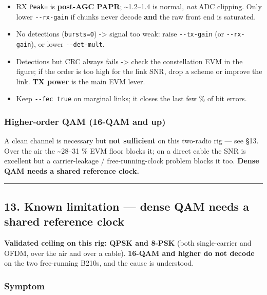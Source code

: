 \documentclass[
  10pt,
]{article}
\providecommand{\tightlist}{%
  \setlength{\itemsep}{0pt}\setlength{\parskip}{0pt}}
\begin{document}
\begin{itemize}
\tightlist
\item
  RX \texttt{Peak=} is \textbf{post-AGC PAPR}; \textasciitilde1.2--1.4
  is normal, \emph{not} ADC clipping. Only lower \texttt{-\/-rx-gain} if
  chunks never decode \textbf{and} the raw front end is saturated.
\item
  No detections (\texttt{bursts=0}) -\textgreater{} signal too weak:
  raise \texttt{-\/-tx-gain} (or \texttt{-\/-rx-gain}), or lower
  \texttt{-\/-det-mult}.
\item
  Detections but CRC always fails -\textgreater{} check the
  constellation EVM in the figure; if the order is too high for the link
  SNR, drop a scheme or improve the link. \textbf{TX power} is the main
  EVM lever.
\item
  Keep \texttt{-\/-fec\ true} on marginal links; it closes the last few
  \% of bit errors.
\end{itemize}

\hypertarget{higher-order-qam-16-qam-and-up}{%
\subsubsection{Higher-order QAM (16-QAM and
up)}\label{higher-order-qam-16-qam-and-up}}

A clean channel is necessary but \textbf{not sufficient} on this
two-radio rig --- see §13. Over the air the \textasciitilde28--31 \% EVM
floor blocks it; on a direct cable the SNR is excellent but a
carrier-leakage / free-running-clock problem blocks it too.
\textbf{Dense QAM needs a shared reference clock.}

\begin{center}\rule{0.5\linewidth}{0.5pt}\end{center}

\hypertarget{13-known-limitation--dense-qam-needs-a-shared-reference-clock}{%
\subsection{13. Known limitation --- dense QAM needs a shared reference
clock}\label{13-known-limitation--dense-qam-needs-a-shared-reference-clock}}

\textbf{Validated ceiling on this rig: QPSK and 8-PSK} (both
single-carrier and OFDM, over the air and over a cable). \textbf{16-QAM
and higher do not decode} on the two free-running B210s, and the cause
is understood.

\hypertarget{symptom}{%
\subsubsection{Symptom}\label{symptom}}
\end{document}
